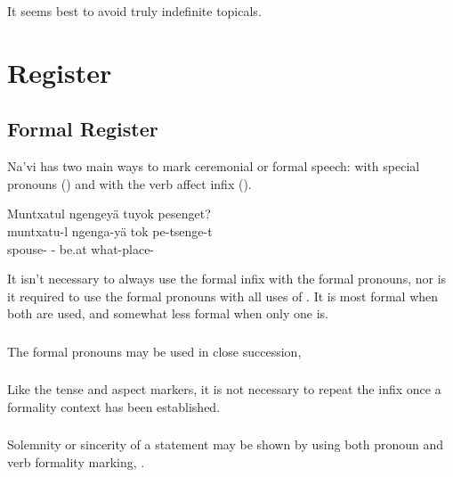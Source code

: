 \noindent It seems best to avoid truly indefinite topicals.


\section{Register}

\subsection{Formal Register} Na'vi has two main ways to mark
ceremonial or formal speech: with special pronouns
() and with the verb affect infix
 ().

\begin{interlin}
\glll Muntxatul ngengeyä tuyok pesenget? \\
   muntxatu-l ngenga-yä tok pe-tsenge-t \\
   spouse- - be.at what-place-\\
\Ipawl{}
\end{interlin}

\noindent It isn't necessary to always use the formal
infix  with the formal pronouns, nor is it required to use
the formal pronouns with all uses of .  It is most formal
when both are used, and somewhat less formal when only one is.

\subsubsection{} The formal pronouns may be used in close succession,
 

\subsubsection{} Like the tense and aspect markers, it is not
necessary to repeat the infix  once a formality context
has been established.

\subsubsection{} Solemnity or sincerity of a statement may be shown by
using both pronoun and verb formality marking,  .


